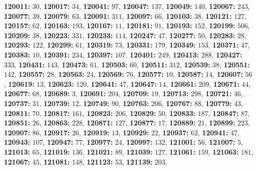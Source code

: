 \textsf{\bfseries 120011:} $30$, \textsf{\bfseries 120017:} $34$, \textsf{\bfseries 120041:} $97$, \textsf{\bfseries 120047:} $137$, \textsf{\bfseries 120049:} $140$, \textsf{\bfseries 120067:} $243$, \textsf{\bfseries 120077:} $39$, \textsf{\bfseries 120079:} $63$, \textsf{\bfseries 120091:} $311$, \textsf{\bfseries 120097:} $66$, \textsf{\bfseries 120103:} $38$, \textsf{\bfseries 120121:} $127$, \textsf{\bfseries 120157:} $62$, \textsf{\bfseries 120163:} $193$, \textsf{\bfseries 120167:} $11$, \textsf{\bfseries 120181:} $91$, \textsf{\bfseries 120193:} $152$, \textsf{\bfseries 120199:} $506$, \textsf{\bfseries 120209:} $38$, \textsf{\bfseries 120223:} $331$, \textsf{\bfseries 120233:} $114$, \textsf{\bfseries 120247:} $47$, \textsf{\bfseries 120277:} $50$, \textsf{\bfseries 120283:} $28$, \textsf{\bfseries 120293:} $122$, \textsf{\bfseries 120299:} $61$, \textsf{\bfseries 120319:} $73$, \textsf{\bfseries 120331:} $179$, \textsf{\bfseries 120349:} $153$, \textsf{\bfseries 120371:} $47$, \textsf{\bfseries 120383:} $10$, \textsf{\bfseries 120391:} $234$, \textsf{\bfseries 120397:} $107$, \textsf{\bfseries 120401:} $249$, \textsf{\bfseries 120413:} $288$, \textsf{\bfseries 120427:} $333$, \textsf{\bfseries 120431:} $143$, \textsf{\bfseries 120473:} $61$, \textsf{\bfseries 120503:} $60$, \textsf{\bfseries 120511:} $312$, \textsf{\bfseries 120539:} $38$, \textsf{\bfseries 120551:} $142$, \textsf{\bfseries 120557:} $28$, \textsf{\bfseries 120563:} $24$, \textsf{\bfseries 120569:} $76$, \textsf{\bfseries 120577:} $10$, \textsf{\bfseries 120587:} $14$, \textsf{\bfseries 120607:} $56$, \textsf{\bfseries 120619:} $13$, \textsf{\bfseries 120623:} $120$, \textsf{\bfseries 120641:} $47$, \textsf{\bfseries 120647:} $14$, \textsf{\bfseries 120661:} $209$, \textsf{\bfseries 120671:} $44$, \textsf{\bfseries 120677:} $68$, \textsf{\bfseries 120689:} $3$, \textsf{\bfseries 120691:} $204$, \textsf{\bfseries 120709:} $19$, \textsf{\bfseries 120713:} $298$, \textsf{\bfseries 120721:} $46$, \textsf{\bfseries 120737:} $31$, \textsf{\bfseries 120739:} $12$, \textsf{\bfseries 120749:} $90$, \textsf{\bfseries 120763:} $206$, \textsf{\bfseries 120767:} $88$, \textsf{\bfseries 120779:} $43$, \textsf{\bfseries 120811:} $70$, \textsf{\bfseries 120817:} $161$, \textsf{\bfseries 120823:} $206$, \textsf{\bfseries 120829:} $50$, \textsf{\bfseries 120833:} $187$, \textsf{\bfseries 120847:} $87$, \textsf{\bfseries 120851:} $26$, \textsf{\bfseries 120863:} $228$, \textsf{\bfseries 120871:} $127$, \textsf{\bfseries 120877:} $17$, \textsf{\bfseries 120889:} $21$, \textsf{\bfseries 120899:} $223$, \textsf{\bfseries 120907:} $86$, \textsf{\bfseries 120917:} $26$, \textsf{\bfseries 120919:} $13$, \textsf{\bfseries 120929:} $22$, \textsf{\bfseries 120937:} $62$, \textsf{\bfseries 120941:} $47$, \textsf{\bfseries 120943:} $107$, \textsf{\bfseries 120947:} $77$, \textsf{\bfseries 120977:} $24$, \textsf{\bfseries 120997:} $132$, \textsf{\bfseries 121001:} $56$, \textsf{\bfseries 121007:} $5$, \textsf{\bfseries 121013:} $65$, \textsf{\bfseries 121019:} $136$, \textsf{\bfseries 121021:} $89$, \textsf{\bfseries 121039:} $127$, \textsf{\bfseries 121061:} $159$, \textsf{\bfseries 121063:} $181$, \textsf{\bfseries 121067:} $45$, \textsf{\bfseries 121081:} $148$, \textsf{\bfseries 121123:} $53$, \textsf{\bfseries 121139:} $203$, 
